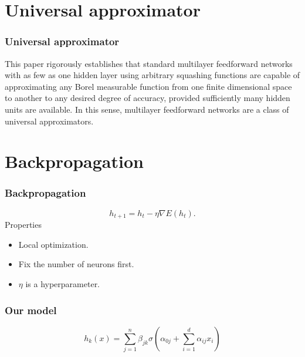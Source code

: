 \section{Universal approximator}
\begin{frame}
  \frametitle{Universal approximator}

  This paper rigorously establishes that standard multilayer feedforward networks with as few as one hidden layer using arbitrary squashing functions are capable of approximating any Borel measurable function from one finite dimensional space to another to any desired degree of accuracy, provided sufficiently many hidden units are available. In this sense, multilayer feedforward networks are a class of universal approximators.
  \cite{Multilayerfeedforwardnetworksareuniversalapproximators}

\end{frame}
\section{Backpropagation}
\begin{frame}
  \frametitle{Backpropagation}
\begin{equation}\label{eq:descenso-gradiente}
    h_{t+1}  = h_t - \eta \nabla E(h_t).
\end{equation} 
Properties 
\begin{itemize}
  \item Local optimization. 
  \item Fix the number of neurons first. 
  \item $\eta$ is a hyperparameter.  
\end{itemize}
\end{frame}

\begin{frame}
  \frametitle{Our model}

  \begin{equation}\label{eq:red-neuronal-que-aprender}
    h_k(x) = 
    \sum_{j=1}^n \beta_{j k}
    \sigma
    \left(  
        \alpha_{0 j} +
        \sum_{i=1}^d \alpha_{i j}x_i
    \right)
\end{equation}
  
\end{frame}

